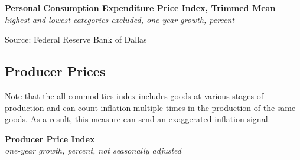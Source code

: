 \documentclass{report}
\makeatletter
\newcommand{\tbllink}[1]{\href{https://raw.githubusercontent.com/bdecon/US-chartbook/master/chartbook/data/#1}{\faTable}}
\newcommand*\short[1]{\expandafter\@gobbletwo\number\numexpr#1\relax}
\newcommand{\dateaxisticks}{
		date coordinates in=x, axis line style={draw=none},
		xmax={2023-11-01},
		max space between ticks=40,	    
		xtick={{1990-01-01}, {1992-01-01}, {1994-01-01}, 
			{1996-01-01}, {1998-01-01}, {2000-01-01}, 
			{2002-01-01}, {2004-01-01}, {2006-01-01},
			{2008-01-01}, {2010-01-01}, {2012-01-01}, {2014-01-01},
		    {2016-01-01}, {2018-01-01}, {2020-01-01}, {2022-01-01}, 
		    {2024-01-01}, {2026-01-01}},
		minor xtick={{1989-01-01}, {1991-01-01}, {1993-01-01},
			{1995-01-01}, {1997-01-01}, {1999-01-01}, 
			{2001-01-01}, {2003-01-01}, {2005-01-01}, {2007-01-01},
		    {2009-01-01}, {2011-01-01}, {2013-01-01}, {2015-01-01},
		    {2017-01-01}, {2019-01-01}, {2021-01-01}, {2023-01-01}, 
		    {2025-01-01}, {2027-01-01}},
		enlarge y limits={0.06}, enlarge x limits={0.01},
		}
\newcommand{\bbar}[2]{extra #1 ticks = {{#2}}, extra #1 tick labels = ,
		extra #1 tick style = {grid=major, grid style={thick, black!25}},}
\newcommand{\thickline}[4]{\addplot[ultra thick, no markers, color=#1] 
		table [x=#2, y=#3, col sep=comma] {#4};	}
\newcommand{\rbars}{
		\fill[color=black!10] (axis cs:{1990-07-01},\pgfkeysvalueof{/pgfplots/ymin}) rectangle 
			(axis cs:{1991-03-01}, \pgfkeysvalueof{/pgfplots/ymax});
		\fill[color=black!10] (axis cs:{2007-12-01},\pgfkeysvalueof{/pgfplots/ymin}) rectangle 
			(axis cs:{2009-07-01}, \pgfkeysvalueof{/pgfplots/ymax});
		\fill[color=black!10] (axis cs:{2001-03-01},\pgfkeysvalueof{/pgfplots/ymin}) rectangle 
			(axis cs:{2001-11-01}, \pgfkeysvalueof{/pgfplots/ymax});
		\fill[color=black!10] (axis cs:{2020-02-01},\pgfkeysvalueof{/pgfplots/ymin}) rectangle 
			(axis cs:{2020-05-01}, \pgfkeysvalueof{/pgfplots/ymax});}
\makeatother
\begin{document}
{{\begin{minipage}{0.76\textwidth}

\vspace{1mm}

\normalsize \textbf{Personal Consumption Expenditure Price Index, Trimmed Mean}\\
\footnotesize{\textit{highest and lowest categories excluded, one-year growth, percent}}
\vspace{2.9cm}

\hspace{1mm} 

\footnotesize{Source: Federal Reserve Bank of Dallas} \hfill \tbllink{pce_tm12.csv}
\end{minipage} 
\newpage
\vspace{-10mm}

\begin{minipage}{0.76\textwidth}
\hypertarget{prp}{\label{prp}}
\subsection*{Producer Prices}

\small 

Note that the all commodities index includes goods at various stages of production and can count inflation multiple times in the production of the same goods. As a result, this measure can send an exaggerated inflation signal. 
\vspace{0.5mm}

\normalsize \textbf{Producer Price Index}\\
\footnotesize{\textit{one-year growth, percent, not seasonally adjusted}}
\vspace{2.9cm}


\end{minipage}}}
\end{document}
